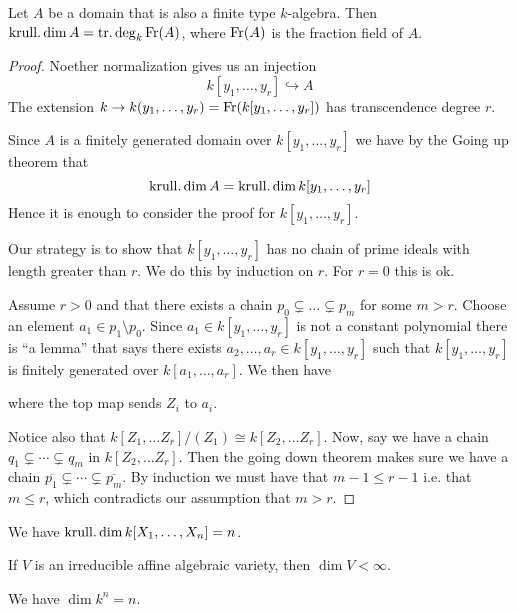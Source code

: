 \begin{theorem}
Let $A$ be a domain that is also a finite type $k$-algebra. Then $\operatorname{krull.dim} A = \operatorname{tr.deg}_k \operatorname{Fr}(A)$, where $\operatorname{Fr}(A)$ is the fraction field of $A$. 
\end{theorem}
\begin{proof}
Noether normalization gives us an injection
\begin{equation*}
    k[y_1, \ldots, y_r] \hookrightarrow A
\end{equation*}
The extension $k\rightarrow k(y_1, \ldots, y_r)=\operatorname{Fr}(k[y_1, \ldots, y_r])$ has transcendence degree $r$. 

Since $A$ is a finitely generated domain over $k[y_1, \ldots, y_r]$ we have by the Going up theorem that 
\begin{equation*}
    \operatorname{krull.dim} A = \operatorname{krull.dim} k[y_1, \ldots, y_r]
\end{equation*}
Hence it is enough to consider the proof for $k[y_1, \ldots, y_r]$. 

Our strategy is to show that $k[y_1, \ldots, y_r]$ has no chain of prime ideals with length greater than $r$. We do this by induction on $r$. For $r=0$ this is ok.

Assume $r>0$ and that there exists a chain $p_0\subsetneq \ldots \subsetneq p_m$ for some $m>r$. Choose an element $a_1\in p_1\setminus p_0$. Since $a_1\in k[y_1, \ldots, y_r]$ is not a constant polynomial there is ``a lemma'' that says there exists $a_2, \ldots, a_r \in k[y_1, \ldots, y_r]$ such that $k[y_1, \ldots, y_r]$ is finitely generated over $k[a_1, \ldots, a_r]$. We then have
\begin{center}
\end{center}
where the top map sends $Z_i$ to $a_i$. 

Notice also that $k[Z_1, \ldots Z_r]/(Z_1) \cong k[Z_2, \ldots Z_r]$. Now, say we have a chain $q_1\subsetneq \cdots \subsetneq q_m$ in $k[Z_2, \ldots Z_r]$. Then the going down theorem makes sure we have a chain $\overline{p_1}\subsetneq \cdots \subsetneq \overline{p_m}$. By induction we must have that $m-1\leq r-1$ i.e. that $m\leq r$, which contradicts our assumption that $m>r$. 
\end{proof}

\begin{corollary}
We have $\operatorname{krull.dim} k[X_1, \ldots, X_n]=n$.
\end{corollary}

\begin{corollary}
If $V$ is an irreducible affine algebraic variety, then $\dim V < \infty$. 
\end{corollary}

\begin{corollary}
We have $\dim k^n = n$.
\end{corollary}